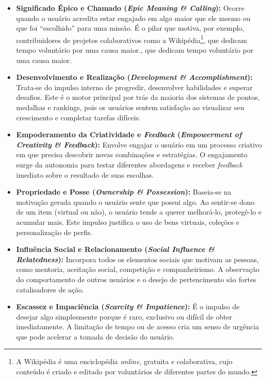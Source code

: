 \begin{itemize}
    \item \textbf{Significado Épico e Chamado (\textit{Epic Meaning \& Calling}):} Ocorre quando o usuário acredita estar engajado em algo maior que ele mesmo ou que foi ``escolhido'' para uma missão. É o pilar que motiva, por exemplo, contribuidores de projetos colaborativos como a  Wikipédia\footnote{A Wikipédia é uma enciclopédia \textit{online}, gratuita e colaborativa, cujo conteúdo é criado e editado por voluntários de diferentes partes do mundo.}, que dedicam tempo voluntário por uma causa maior., que dedicam tempo voluntário por uma causa maior.

    \item \textbf{Desenvolvimento e Realização (\textit{Development \& Accomplishment}):} Trata-se do impulso interno de progredir, desenvolver habilidades e superar desafios. Este é o motor principal por trás da maioria dos sistemas de pontos, medalhas e rankings, pois os usuários sentem satisfação ao visualizar seu crescimento e completar tarefas difíceis.

    \item \textbf{Empoderamento da Criatividade e \textit{Feedback} (\textit{Empowerment of Creativity \& Feedback}):} Envolve engajar o usuário em um processo criativo em que precisa descobrir novas combinações e estratégias. O engajamento surge da autonomia para testar diferentes abordagens e receber \textit{feedback} imediato sobre o resultado de suas escolhas.

    \item \textbf{Propriedade e Posse (\textit{Ownership \& Possession}):} Baseia-se na motivação gerada quando o usuário sente que possui algo. Ao sentir-se dono de um item (virtual ou não), o usuário tende a querer melhorá-lo, protegê-lo e acumular mais. Este impulso justifica o uso de bens virtuais, coleções e personalização de perfis.

    \item \textbf{Influência Social e Relacionamento (\textit{Social Influence \& Relatedness}):} Incorpora todos os elementos sociais que motivam as pessoas, como mentoria, aceitação social, competição e companheirismo. A observação do comportamento de outros usuários e o desejo de pertencimento são fortes catalisadores de ação.

    \item \textbf{Escassez e Impaciência (\textit{Scarcity \& Impatience}):} É o impulso de desejar algo simplesmente porque é raro, exclusivo ou difícil de obter imediatamente. A limitação de tempo ou de acesso cria um senso de urgência que pode acelerar a tomada de decisão do usuário.


\end{itemize}
